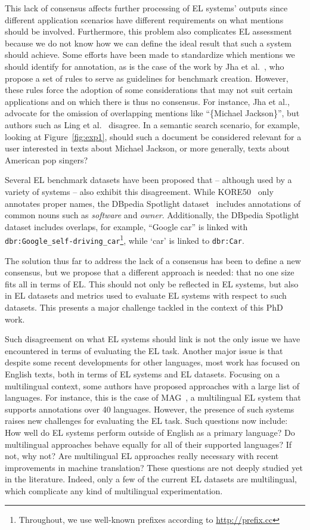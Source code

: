 \documentclass[sigconf]{acmart}
\begin{document}
This lack of consensus affects further processing of EL systems' outputs since different application scenarios have different requirements on what mentions should be involved. Furthermore, this problem also complicates EL assessment because we do not know how we can define the ideal result that such a system should achieve. Some efforts have been made to standardize which mentions we should identify for annotation, as is the case of the work by Jha et al.~\cite{JhaRN17}, who propose a set of rules to serve as guidelines for benchmark creation. However, these rules force the adoption of some considerations that may not suit certain applications and on which there is thus no consensus. For instance, Jha et al., advocate for the omission of overlapping mentions like ``\{Michael Jackson\}'', but authors such as Ling et al.~\cite{LingSW15} disagree. In a semantic search scenario, for example, looking at Figure~\ref{fig:exp1}, should such a document be considered relevant for a user interested in texts about Michael Jackson, or more generally, texts about American pop singers?

Several EL benchmark datasets have been proposed that -- although used by a variety of systems -- also exhibit this disagreement. While KORE50~\cite{HoffartSNTW12} only annotates proper names, the DBpedia Spotlight dataset~\cite{MendesJGB11} includes annotations of common nouns such as \textit{software} and \textit{owner}. Additionally, the DBpedia Spotlight dataset includes overlaps, for example, ``Google car'' is linked with \texttt{dbr:Google\_self-driving\_car}\footnote{Throughout, we use well-known prefixes according to \url{http://prefix.cc}}, while `car' is linked to \texttt{dbr:Car}. 

The solution thus far to address the lack of a consensus has been to define a new consensus, but we propose that a different approach is needed: that no one size fits all in terms of EL. This should not only be reflected in EL systems, but also in EL datasets and metrics used to evaluate EL systems with respect to such datasets. This presents a major challenge tackled in the context of this PhD work.

Such disagreement on what EL systems should link is not the only issue we have encountered in terms of evaluating the EL task. Another major issue is that despite some recent developments for other languages, most work has focused on English texts, both in terms of EL systems and EL datasets. Focusing on a multilingual context, some authors have proposed approaches with a large list of languages. For instance, this is the case of MAG~\cite{MoussallemURN18}, a multilingual EL system that supports annotations over 40 languages. However, the presence of such systems raises new challenges for evaluating the EL task. Such questions now include: How well do EL systems perform outside of English as a primary language? Do multilingual approaches behave equally for all of their supported languages? If not, why not? Are multilingual EL approaches really necessary with recent improvements in machine translation? These questions are not deeply studied yet in the literature. Indeed, only a few of the current EL datasets are multilingual, which complicate any kind of multilingual experimentation. 
\end{document}
